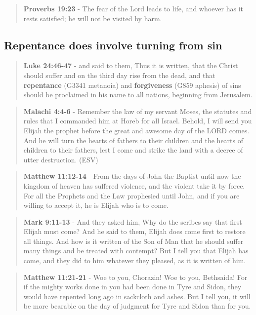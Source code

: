 \documentclass[11pt]{article}
\begin{document}
\begin{quote}
\textbf{Proverbs 19:23} - The fear of the Lord leads to life, and whoever has it rests satisfied; he will not be visited by harm.
\end{quote}

\subsection{Repentance does involve turning from sin}
\label{sec:org7ee19f7}
\begin{quote}
\textbf{Luke 24:46-47} - and said to them, Thus it is written, that the Christ should suffer and on the third day rise from the dead, and that \textbf{repentance} (G3341 metanoia) and \textbf{forgiveness} (G859 aphesis) of sins should be proclaimed in his name to all nations, beginning from Jerusalem.
\end{quote}

\begin{quote}
\textbf{Malachi 4:4-6} - Remember the law of my servant Moses, the statutes and rules that I commanded him at Horeb for all Israel. Behold, I will send you Elijah the prophet before the great and awesome day of the LORD comes. And he will turn the hearts of fathers to their children and the hearts of children to their fathers, lest I come and strike the land with a decree of utter destruction. (ESV)
\end{quote}

\begin{quote}
\textbf{Matthew 11:12-14} - From the days of John the Baptist until now the kingdom of heaven has suffered violence, and the violent take it by force. For all the Prophets and the Law prophesied until John, and if you are willing to accept it, he is Elijah who is to come.
\end{quote}

\begin{quote}
\textbf{Mark 9:11-13} - And they asked him, Why do the scribes say that first Elijah must come? And he said to them, Elijah does come first to restore all things. And how is it written of the Son of Man that he should suffer many things and be treated with contempt? But I tell you that Elijah has come, and they did to him whatever they pleased, as it is written of him.
\end{quote}

\begin{quote}
\textbf{Matthew 11:21-21} - Woe to you, Chorazin! Woe to you, Bethsaida! For if the mighty works done in you had been done in Tyre and Sidon, they would have repented long ago in sackcloth and ashes. But I tell you, it will be more bearable on the day of judgment for Tyre and Sidon than for you.
\end{quote}
\end{document}
